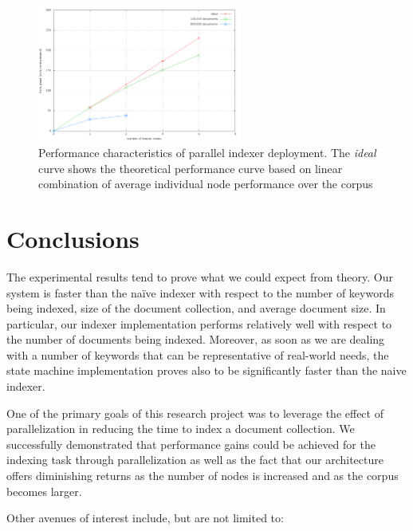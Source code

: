 \documentclass[10pt]{article}
\begin{document}
\begin{figure}
  \begin{center}
        \includegraphics[width=0.60\textwidth,height=!]{parallelization}
  \end{center}
  \caption{Performance characteristics of parallel indexer
    deployment. The \textit{ideal} curve shows the theoretical
    performance curve based on linear combination of average
    individual node performance over the corpus} 
  \label{fig:parallelization}
\end{figure} 


\section{Conclusions}
\label{sec:conclusions}
The experimental results tend to prove what we could expect from
theory. Our system is faster than the na\"{i}ve indexer with respect
to the number of keywords being indexed, size of the document
collection, and average document size. In particular, our indexer
implementation performs relatively well with respect to the number of
documents being indexed. Moreover, as soon as we are dealing with a number of
keywords that can be representative of real-world needs, the state
machine implementation proves also to be significantly faster than the
naive indexer. 

One of the primary goals of this research project was to leverage the
effect of parallelization in reducing the time to index a document
collection. We successfully demonstrated that performance gains could
be achieved for the indexing task through parallelization as well as
the fact that our architecture offers diminishing returns as the
number of nodes is increased and as the corpus becomes larger.

 Other avenues of interest include, but are not limited
to:
\end{document}
